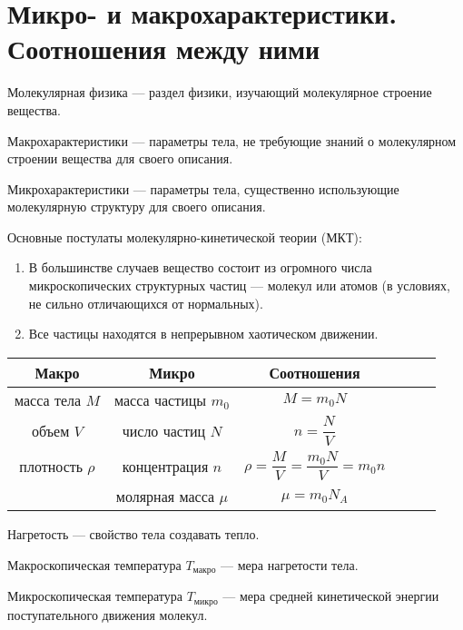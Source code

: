 \section{Микро- и макрохарактеристики. Соотношения между ними}

Молекулярная физика --- раздел физики, изучающий молекулярное строение вещества. \par
Макрохарактеристики --- параметры тела, не требующие знаний о молекулярном строении вещества для своего описания. \par
Микрохарактеристики --- параметры тела, существенно использующие молекулярную структуру для своего описания. \par
Основные постулаты молекулярно-кинетической теории (МКТ):
\begin{enumerate}
	\item В большинстве случаев вещество состоит из огромного числа микроскопических структурных частиц --- молекул или атомов (в условиях, не сильно отличающихся от нормальных).
	\item Все частицы находятся в непрерывном хаотическом движении.
\end{enumerate}

\begin{table}[htp]
	\centering
	\begin{tabular}{*{6}{c}}
		\toprule
			Макро & Микро & Соотношения \\
		\midrule
			масса тела $M$ 		& масса частицы $m_0$ 	& $M=m_0N$ 									\\
			объем $V$ 			& число частиц $N$ 		& $n=\dfrac NV$ 							\\
			плотность $\rho$	& концентрация $n$		& $\rho=\dfrac MV=\dfrac{m_0 N}V = m_0n$ 	\\
								& молярная масса $\mu$	& $\mu=m_0N_A$ 								\\
			
		\toprule
	\end{tabular}
\end{table}

Нагретость --- свойство тела создавать тепло. \par
Макроскопическая температура $T_{\text{макро}}$ --- мера нагретости тела. \par
Микроскопическая температура $T_{\text{микро}}$ --- мера средней кинетической энергии поступательного движения молекул.